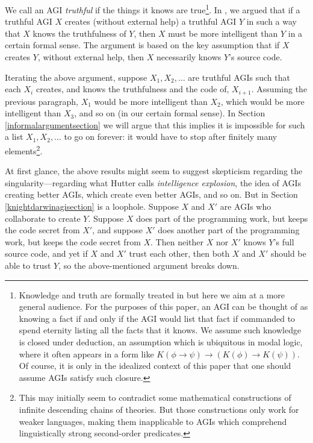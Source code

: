 \documentclass[runningheads]{llncs}
\begin{document}
We call an AGI \emph{truthful} if the things it knows
are true\footnote{Knowledge and truth are formally
treated in \cite{alexander2019measuring} but here we aim at a more general audience.
For the purposes of this paper, an AGI can be thought of as knowing a fact if and only
if the AGI would list that fact if commanded to spend eternity listing all the facts
that it knows. We assume such knowledge is closed under deduction, an assumption which
is ubiquitous in modal logic, where it often appears in a form like
$K(\phi\rightarrow\psi)\rightarrow (K(\phi)\rightarrow K(\psi))$.
Of course,
it is only in the idealized context of this paper that one should assume AGIs
satisfy such closure.}.
In \cite{alexander2019measuring}, we argued
that if a truthful AGI $X$ creates (without external help) a truthful AGI $Y$ in such a way
that $X$ knows the truthfulness
of $Y$, then $X$ must be more intelligent than $Y$
in a certain formal sense. The argument is based on the key assumption that if $X$
creates $Y$, without external help, then $X$ necessarily knows $Y$'s source code.

Iterating the above argument, suppose $X_1,X_2,\ldots$
are truthful AGIs such that each $X_i$ creates, and knows the truthfulness and
the code of, $X_{i+1}$. Assuming the previous paragraph, $X_1$ would be more
intelligent than $X_2$, which would be more
intelligent than $X_3$, and so on (in our certain formal sense).
In Section \ref{informalargumentsection} we will argue that this implies
it is impossible for such
a list $X_1,X_2,\ldots$ to go on forever: it would have to stop after finitely
many elements\footnote{This may initially seem to contradict some mathematical
constructions \cite{kripke2019ungroundedness}
\cite{visser2002semantics} of infinite descending chains of theories. But those
constructions only work for weaker languages, making them inapplicable to
AGIs which comprehend
linguistically strong second-order predicates.}.

At first glance, the above results might
seem to suggest skepticism regarding the singularity---regarding
what Hutter \cite{hutter2012} calls \emph{intelligence explosion}, the idea of
AGIs creating better AGIs, which create even better AGIs, and so on.
But in Section \ref{knightdarwinagisection} is a loophole. Suppose $X$ and $X'$ are AGIs
who collaborate to create $Y$. Suppose $X$
does part of the programming work,
but keeps the code secret from $X'$, and suppose $X'$ does another part of
the programming work, but keeps the code secret from $X$.
Then neither
$X$ nor $X'$ knows $Y$'s full source code, and yet if $X$ and $X'$ trust
each other, then both $X$ and $X'$ should be able to trust $Y$, so the above-mentioned
argument breaks down.
\end{document}
